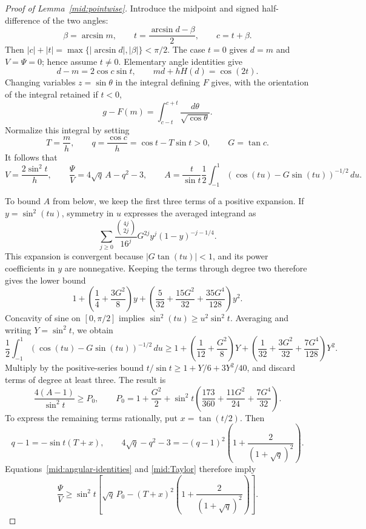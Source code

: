 \begin{proof}[Proof of Lemma~\ref{mid:pointwise}]
Introduce the midpoint and signed half-difference of the two angles:
\[
 \beta=\arcsin m,\qquad t=\frac{\arcsin d-\beta}{2},\qquad
 c=t+\beta.
\]
Then \(|c|+|t|=\max\{|\arcsin d|,|\beta|\}<\pi/2\).
The case \(t=0\) gives \(d=m\) and \(V=\Psi=0\); hence assume
\(t\ne0\). Elementary angle identities give
\[
 d-m=2\cos c\sin t,\qquad md+hH(d)=\cos(2t).
\]
Changing variables \(z=\sin\theta\) in the integral defining \(F\)
gives, with the orientation of the integral retained if \(t<0\),
\[
 g-F(m)=\int_{c-t}^{c+t}\frac{d\theta}{\sqrt{\cos\theta}}.
\]
Normalize this integral by setting
\[
 T=\frac mh,\qquad q=\frac{\cos c}{h}=\cos t-T\sin t>0,
 \qquad G=\tan c.
\]
It follows that
\begin{equation}\label{mid:angular-identities}
 V=\frac{2\sin^2t}{h},\qquad
 \frac{\Psi}{V}=4\sqrt q\,A-q^2-3,
 \qquad
 A=\frac{t}{\sin t}\frac12\int_{-1}^1
       (\cos(tu)-G\sin(tu))^{-1/2}\,du.
\end{equation}

To bound \(A\) from below, we keep the first three terms of a positive
expansion. If
\(y=\sin^2(tu)\), symmetry in \(u\) expresses the averaged integrand as
\[
 \sum_{j\ge0}\frac{\binom{4j}{2j}}{16^j}
     G^{2j}y^j(1-y)^{-j-1/4}.
\]
This expansion is convergent because \(|G\tan(tu)|<1\), and its
power coefficients in \(y\) are nonnegative. Keeping the terms through
degree two therefore gives the lower bound
\[
 1+\left(\frac14+\frac{3G^2}{8}\right)y
  +\left(\frac5{32}+\frac{15G^2}{32}
                 +\frac{35G^4}{128}\right)y^2.
\]
Concavity of sine on \([0,\pi/2]\) implies
\(\sin^2(tu)\ge u^2\sin^2t\). Averaging and writing
\(Y=\sin^2t\), we obtain
\[
 \frac12\int_{-1}^1(\cos(tu)-G\sin(tu))^{-1/2}\,du
 \ge1+\left(\frac1{12}+\frac{G^2}{8}\right)Y
       +\left(\frac1{32}+\frac{3G^2}{32}
                       +\frac{7G^4}{128}\right)Y^2.
\]
Multiply by the positive-series bound
\(t/\sin t\ge1+Y/6+3Y^2/40\), and discard terms of degree at
least three. The result is
\begin{equation}\label{mid:Taylor}
 \frac{4(A-1)}{\sin^2t}\ge P_0,
 \qquad
 P_0=1+\frac{G^2}{2}
 +\sin^2t\left(\frac{173}{360}+\frac{11G^2}{24}
                                  +\frac{7G^4}{32}\right).
\end{equation}
To express the remaining terms rationally, put \(x=\tan(t/2)\).
Then
\[
 q-1=-\sin t(T+x),\qquad
 4\sqrt q-q^2-3
 =-(q-1)^2\left(1+\frac2{(1+\sqrt q)^2}\right).
\]
Equations~\eqref{mid:angular-identities} and \eqref{mid:Taylor}
therefore imply
\begin{equation}\label{mid:bracket}
 \frac{\Psi}{V}\ge\sin^2t
 \left[\sqrt q\,P_0
 -(T+x)^2\left(1+\frac2{(1+\sqrt q)^2}\right)\right].
\end{equation}


\end{proof}
